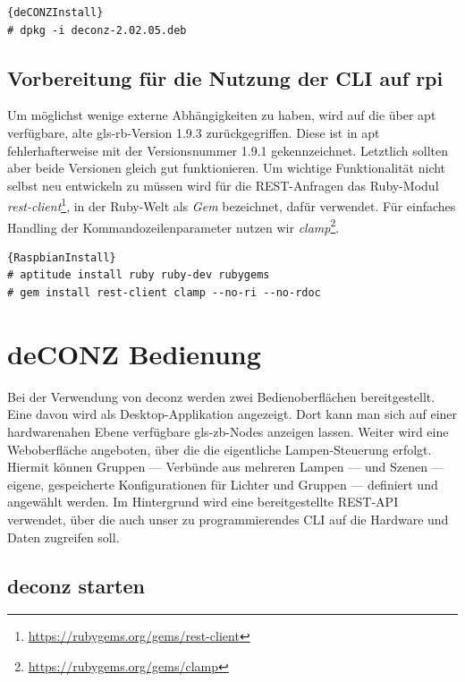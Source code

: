 \documentclass[a4paper,12pt]{article}
\begin{document}
\begin{lstlisting}[caption=deCONZ installieren]{deCONZInstall}
# dpkg -i deconz-2.02.05.deb
\end{lstlisting}

\subsection{Vorbereitung für die Nutzung der CLI auf \gls{rpi}}

Um möglichst wenige externe Abhängigkeiten zu haben, wird auf die über \gls{apt}
verfügbare, alte \gls{gls-rb}-Version 1.9.3 zurückgegriffen. Diese ist in \gls{apt}
fehlerhafterweise mit der Versionsnummer 1.9.1 gekennzeichnet. Letztlich sollten
aber beide Versionen gleich gut funktionieren.
Um wichtige Funktionalität nicht selbst neu entwickeln zu müssen wird für die
REST-Anfragen das Ruby-Modul
\emph{rest-client}\footnote{\url{https://rubygems.org/gems/rest-client}}, in der
Ruby-Welt als \emph{Gem} bezeichnet, dafür verwendet. Für einfaches Handling der
Kommandozeilenparameter nutzen wir
\emph{clamp}\footnote{\url{https://rubygems.org/gems/clamp}}.

\begin{lstlisting}[caption=Ruby und Ruby-Modulmanager installieren]{RaspbianInstall}
# aptitude install ruby ruby-dev rubygems
# gem install rest-client clamp --no-ri --no-rdoc
\end{lstlisting}

\section{deCONZ Bedienung}
\label{deconz}

Bei der Verwendung von \acrshort{deconz} werden zwei Bedienoberflächen bereitgestellt.
Eine davon wird als Desktop-Applikation angezeigt. Dort kann man sich auf einer hardwarenahen
Ebene verfügbare \gls{gls-zb}-Nodes anzeigen lassen.
Weiter wird eine Weboberfläche angeboten, über die die eigentliche Lampen-Steuerung
erfolgt. Hiermit können Gruppen --- Verbünde aus mehreren Lampen --- und Szenen
--- eigene, gespeicherte Konfigurationen für Lichter und Gruppen --- definiert und
angewählt werden. Im Hintergrund wird eine bereitgestellte REST-API verwendet, über die
auch unser zu programmierendes CLI auf die Hardware und Daten zugreifen soll.

\subsection{\acrshort{deconz} starten}
\end{document}
